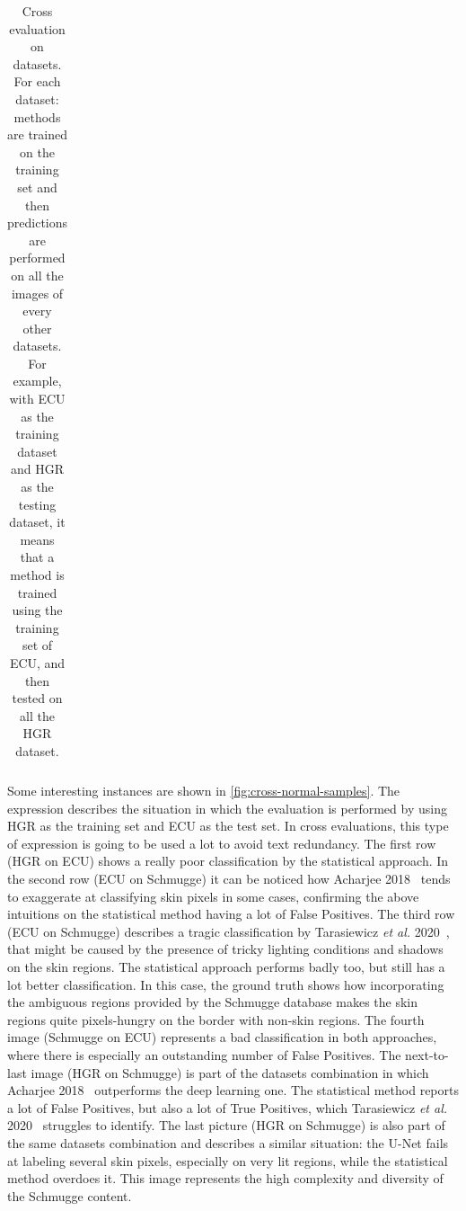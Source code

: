 \begin{table}[ht]
{\begin{tabular}{clcccccc}
        \bottomrule
        \end{tabular}}
    \caption{Cross evaluation on datasets.\\
        For each dataset: methods are trained on the training set and then predictions are performed on all the images of every other datasets.\\
        For example, with ECU as the training dataset and HGR as the testing dataset, it means that a method is trained using the training set of ECU, and then tested on all the HGR dataset.}
    \label{tab:cross-normal}
\end{table}

Some interesting instances are shown in \autoref{fig:cross-normal-samples}.
The expression  describes the situation in which the evaluation is performed by using HGR as the training set and ECU as the test set. In cross evaluations, this type of expression is going to be used a lot to avoid text redundancy.
The first row (HGR on ECU) shows a really poor classification by the statistical approach.
In the second row (ECU on Schmugge) it can be noticed how Acharjee 2018~\cite{acharjee2018skin} tends to exaggerate at classifying skin pixels in some cases, confirming the above intuitions on the statistical method having a lot of False Positives.
The third row (ECU on Schmugge) describes a tragic classification by Tarasiewicz \textit{et al.} 2020~\cite{tarasiewicz2020skinny}, that might be caused by the presence of tricky lighting conditions and shadows on the skin regions.
The statistical approach performs badly too, but still has a lot better classification.
In this case, the ground truth shows how incorporating the ambiguous regions provided by the Schmugge database makes the skin regions quite pixels-hungry on the border with non-skin regions.
The fourth image (Schmugge on ECU) represents a bad classification in both approaches, where there is especially an outstanding number of False Positives.
The next-to-last image (HGR on Schmugge) is part of the datasets combination in which Acharjee 2018~\cite{acharjee2018skin} outperforms the deep learning one.
The statistical method reports a lot of False Positives, but also a lot of True Positives, which Tarasiewicz \textit{et al.} 2020~\cite{tarasiewicz2020skinny} struggles to identify.
The last picture (HGR on Schmugge) is also part of the same datasets combination and describes a similar situation: the U-Net fails at labeling several skin pixels, especially on very lit regions, while the statistical method overdoes it.
This image represents the high complexity and diversity of the Schmugge content.

